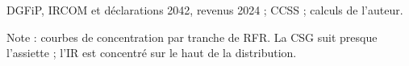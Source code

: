 DGFiP, IRCOM et déclarations 2042, revenus 2024 ; CCSS ; calculs de l'auteur.\par Note : courbes de concentration par tranche de RFR. La CSG suit presque l'assiette ; l'IR est concentré sur le haut de la distribution.
